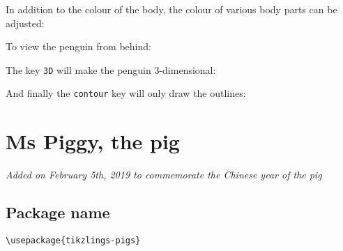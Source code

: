 \documentclass[parskip=half]{scrartcl}
\begin{document}
In addition to the colour of the body, the colour of various body parts can be adjusted:
\begin{tcblisting}{}
\penguin[eye=red]
\end{tcblisting}
\begin{tcblisting}{}
\penguin[pupil=red]
\end{tcblisting}
\begin{tcblisting}{}
\penguin[bill=red]
\end{tcblisting}
\begin{tcblisting}{}
\penguin[belly=red]
\end{tcblisting}
\begin{tcblisting}{}
\penguin[feet=red]
\end{tcblisting}

To view the penguin from behind:
\begin{tcblisting}{}
\penguin[back]
\end{tcblisting}

The key \lstinline|3D| will make the penguin 3-dimensional:
\begin{tcblisting}{}
\penguin[3D]
\end{tcblisting}

And finally the \lstinline|contour| key will only draw the outlines:
\begin{tcblisting}{}
\penguin[contour=black]
\end{tcblisting}

%
%
\clearpage
\section[Pig]{Ms Piggy, the pig}

\emph{Added on February 5th, 2019 to commemorate the Chinese year of the pig}

\subsection{Package name}

\begin{tcolorbox}[lower separated=false, lefthand width=.8\linewidth]
\vspace*{0.5cm}
\lstinline|\usepackage{tikzlings-pigs}| 
\vspace*{0.5cm}
\end{tcolorbox}
\end{document}
